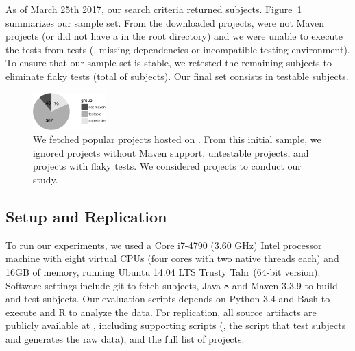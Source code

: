 As of March 25th 2017, our search criteria returned \SubjectsGithub{}
subjects. Figure~\ref{fig:subjects} summarizes our sample set. From
the \SubjectsGithub{} downloaded projects, \SubjectsGithubNotMaven{}
were not Maven projects (or did not have a \pomf{} in the root
directory) and we were unable to execute the tests from
\SubjectsGithubNotTestable{} tests (\eg, missing dependencies or
incompatible testing environment). To ensure that our sample set is
stable, we retested the remaining subjects to eliminate flaky tests
(total of \SubjectsGithubFlaky{} subjects). Our final set consists in
\numSubjs{} testable subjects.

\vspace{-1ex}
\begin{figure}[ht]
    \centering
    \includegraphics[width=0.25\textwidth]{plots/subjs.pdf}
    \caption{\label{fig:subjects}We fetched \SubjectsGithub{} popular
    projects hosted on \github{}. From this initial sample, we ignored
    \SubjectsGithubNotMaven{} projects without Maven support,
    \SubjectsGithubNotTestable{} untestable projects, and
    \SubjectsGithubFlaky{} projects with flaky tests. We considered
    \numSubjs{} projects to conduct our study.}
\end{figure}
\vspace{-2ex}

\subsection{Setup and Replication}
\label{sec:setup}

To run our experiments, we used a Core i7-4790 (3.60 GHz) Intel
processor machine with eight virtual CPUs (four cores with two native
threads each) and 16GB of memory, running Ubuntu 14.04 LTS Trusty Tahr
(64-bit version).  Software settings include git to fetch subjects,
Java 8 and Maven 3.3.9 to build and test subjects. Our evaluation
scripts depends on Python 3.4 and Bash to execute and R to analyze the
data.  For replication, all source artifacts are publicly available at
, including supporting scripts (\eg, the script
that test subjects and generates the raw data), and the full list of
projects. 

